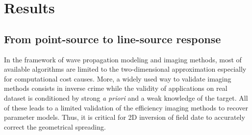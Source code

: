 \documentclass[manuscript,revised]{geophysics}
\newcommand{\twod}{two-dimensional }
\begin{document}





\section{Results}

\subsection{From point-source to line-source response}

\noindent In the framework of wave propagation modeling and imaging methods, most of available algorithms are limited to the \twod approximation especially for computational cost causes. More, a widely used way to validate imaging methods consists in inverse crime while the validity of applications on real dataset is conditioned by strong \textit{a priori} and a weak knowledge of the target. All of these leads to a limited validation of the efficiency imaging methods to recover parameter models. Thus, it is critical for 2D inversion of field date to accurately correct the geometrical spreading.
\end{document}
